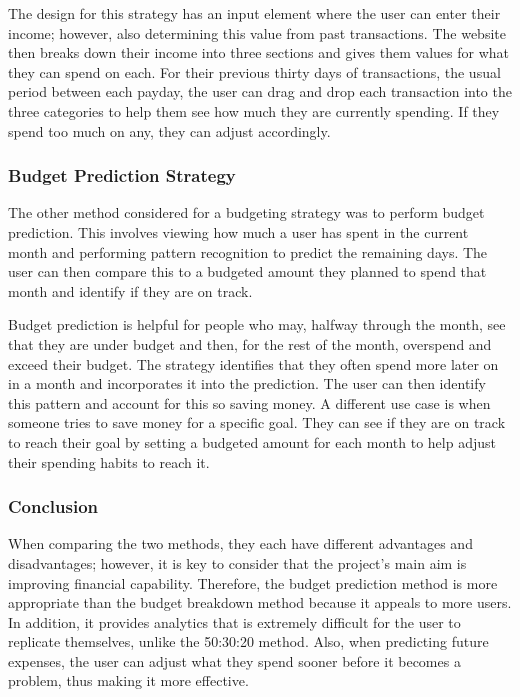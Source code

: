 The design for this strategy has an input element where the user can enter their income; however, also determining this value from past transactions. The website then breaks down their income into three sections and gives them values for what they can spend on each. For their previous thirty days of transactions, the usual period between each payday, the user can drag and drop each transaction into the three categories to help them see how much they are currently spending. If they spend too much on any, they can adjust accordingly.

\subsubsection{Budget Prediction Strategy}
The other method considered for a budgeting strategy was to perform budget prediction. This involves viewing how much a user has spent in the current month and performing pattern recognition to predict the remaining days. The user can then compare this to a budgeted amount they planned to spend that month and identify if they are on track.

Budget prediction is helpful for people who may, halfway through the month, see that they are under budget and then, for the rest of the month, overspend and exceed their budget. The strategy identifies that they often spend more later on in a month and incorporates it into the prediction. The user can then identify this pattern and account for this so saving money. A different use case is when someone tries to save money for a specific goal. They can see if they are on track to reach their goal by setting a budgeted amount for each month to help adjust their spending habits to reach it.

\subsubsection{Conclusion}
When comparing the two methods, they each have different advantages and disadvantages; however, it is key to consider that the project's main aim is improving financial capability. Therefore, the budget prediction method is more appropriate than the budget breakdown method because it appeals to more users. In addition, it provides analytics that is extremely difficult for the user to replicate themselves, unlike the 50:30:20 method. Also, when predicting future expenses, the user can adjust what they spend sooner before it becomes a problem, thus making it more effective.

